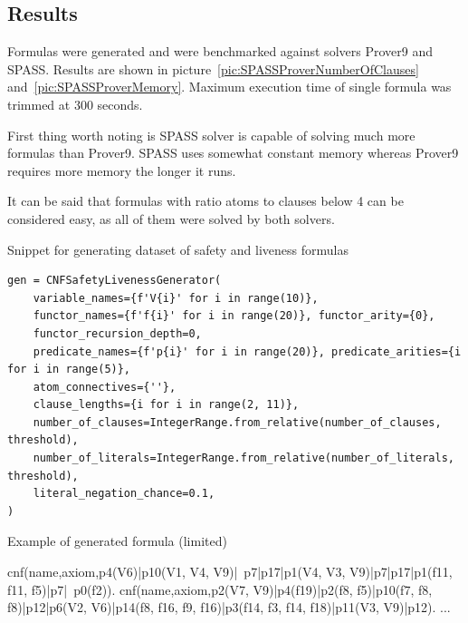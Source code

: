 \subsection{Results}

Formulas were generated and were benchmarked against solvers Prover9 and SPASS. Results are shown in picture~\ref{pic:SPASSProverNumberOfClauses} and~\ref{pic:SPASSProverMemory}. Maximum execution time of single formula was trimmed at 300 seconds. 

First thing worth noting is SPASS solver is capable of solving much more formulas than Prover9. SPASS uses somewhat constant memory whereas Prover9 requires more memory the longer it runs.

It can be said that formulas with ratio atoms to clauses below 4 can be considered easy, as all of them were solved by both solvers.

\begin{listing}[ht]
  \caption{Snippet for generating dataset of safety and liveness formulas}
  \label{lis:CNFSafetyLivenesSnippet}
\begin{verbatim}
gen = CNFSafetyLivenessGenerator(
    variable_names={f'V{i}' for i in range(10)},
    functor_names={f'f{i}' for i in range(20)}, functor_arity={0},
    functor_recursion_depth=0,
    predicate_names={f'p{i}' for i in range(20)}, predicate_arities={i for i in range(5)},
    atom_connectives={''},
    clause_lengths={i for i in range(2, 11)},
    number_of_clauses=IntegerRange.from_relative(number_of_clauses, threshold),
    number_of_literals=IntegerRange.from_relative(number_of_literals, threshold),
    literal_negation_chance=0.1,
)
\end{verbatim}
\end{listing}

\begin{listing}[H]
  \caption{Example of generated formula (limited)}
\begin{tptpcode}
% 
cnf(name,axiom,p4(V6)|p10(V1, V4, V9)|~p7|p17|p1(V4, V3, V9)|p7|p17|p1(f11, f11, f5)|p7|~p0(f2)).
cnf(name,axiom,p2(V7, V9)|p4(f19)|p2(f8, f5)|p10(f7, f8, f8)|p12|p6(V2, V6)|p14(f8, f16, f9, f16)|p3(f14, f3, f14, f18)|p11(V3, V9)|p12).
...
\end{tptpcode}
  \label{lis:TPTPExample}
\end{listing}

